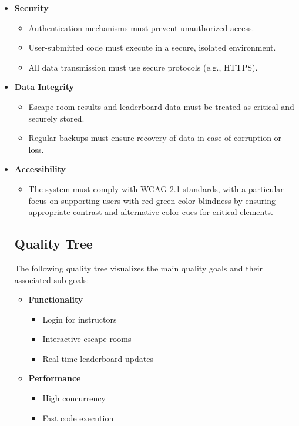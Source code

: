 \begin{itemize}
    \item \textbf{Security}
    \begin{itemize}
        \item Authentication mechanisms must prevent unauthorized access.
        \item User-submitted code must execute in a secure, isolated environment.
        \item All data transmission must use secure protocols (e.g., HTTPS).
    \end{itemize}

    \item \textbf{Data Integrity}
    \begin{itemize}
        \item Escape room results and leaderboard data must be treated as critical and securely stored.
        \item Regular backups must ensure recovery of data in case of corruption or loss.
    \end{itemize}

    \item \textbf{Accessibility}
    \begin{itemize}
        \item The system must comply with WCAG 2.1 standards, with a particular focus on supporting users with red-green color blindness by ensuring appropriate contrast and alternative color cues for critical elements.
\end{itemize}


\hypertarget{_quality_tree}{%
\subsection{Quality Tree}\label{_quality_tree}}
The following quality tree visualizes the main quality goals and their associated sub-goals:
\begin{itemize}
    \item \textbf{Functionality}
    \begin{itemize}
        \item Login for instructors
        \item Interactive escape rooms
        \item Real-time leaderboard updates
    \end{itemize}
    
    \item \textbf{Performance}
    \begin{itemize}
        \item High concurrency
        \item Fast code execution
    \end{itemize}


\end{itemize}
\end{itemize}
